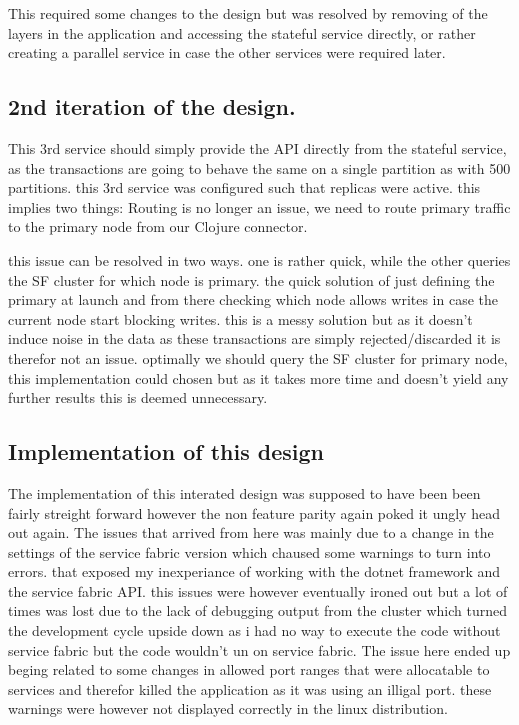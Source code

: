 \documentclass[a4paper,10pt,titlepage]{report}
\begin{document}
This required some changes to the design but was resolved by removing of the layers in the application and accessing the stateful service directly, or rather creating a parallel service in case the other services were required later.

\subsection{2nd iteration of the design.}

This 3rd service should simply provide the API directly from the stateful service, as the transactions are going to behave the same on a single partition as with 500 partitions. this 3rd service was configured such that replicas were active. this implies two things: Routing is no longer an issue, we need to route primary traffic to the primary node from our Clojure connector.

this issue can be resolved in two ways. one is rather quick, while the other queries the SF cluster for which node is primary. the quick solution of just defining the primary at launch and from there checking which node allows writes in case the current node start blocking writes. this is a messy solution but as it doesn't induce noise in the data as these transactions are simply rejected/discarded it is therefor not an issue. optimally we should query the SF cluster for primary node, this implementation could chosen but as it takes more time and doesn't yield any further results this is deemed unnecessary.

\subsection{Implementation of this design}


The implementation of this interated design was supposed to have been been fairly streight forward however the non feature parity again poked it ungly head out again. The issues that arrived from here was mainly due to a change in the settings of the service fabric version which chaused some warnings to turn into errors. that exposed my inexperiance of working with the dotnet framework and the service fabric API. this issues were however eventually ironed out but a lot of times was lost due to the lack of debugging output from the cluster which turned the development cycle upside down as i had no way to execute the code without service fabric but the code wouldn't un on service fabric. The issue here ended up beging related to some changes in allowed port ranges that were allocatable to services and therefor killed the application as it was using an illigal port. these warnings were however not displayed correctly in the linux distribution.
\end{document}
